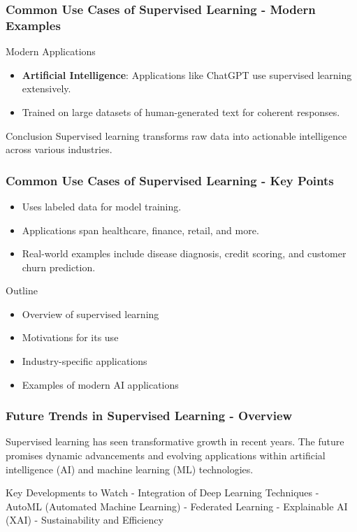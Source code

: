 \documentclass[aspectratio=169]{beamer}
\begin{document}
\begin{frame}[fragile]
    \frametitle{Common Use Cases of Supervised Learning - Modern Examples}
    \begin{block}{Modern Applications}
        \begin{itemize}
            \item \textbf{Artificial Intelligence}: Applications like ChatGPT use supervised learning extensively.
            \item Trained on large datasets of human-generated text for coherent responses.
        \end{itemize}
    \end{block}
    
    \begin{block}{Conclusion}
        Supervised learning transforms raw data into actionable intelligence across various industries.
    \end{block}
\end{frame}

\begin{frame}[fragile]
    \frametitle{Common Use Cases of Supervised Learning - Key Points}
    \begin{itemize}
        \item Uses labeled data for model training.
        \item Applications span healthcare, finance, retail, and more.
        \item Real-world examples include disease diagnosis, credit scoring, and customer churn prediction.
    \end{itemize}
    \begin{block}{Outline}
        \begin{itemize}
            \item Overview of supervised learning
            \item Motivations for its use
            \item Industry-specific applications
            \item Examples of modern AI applications
        \end{itemize}
    \end{block}
\end{frame}

\begin{frame}[fragile]
    \frametitle{Future Trends in Supervised Learning - Overview}
    Supervised learning has seen transformative growth in recent years. The future promises dynamic advancements and evolving applications within artificial intelligence (AI) and machine learning (ML) technologies.

    \begin{block}{Key Developments to Watch}
        - Integration of Deep Learning Techniques
        - AutoML (Automated Machine Learning)
        - Federated Learning
        - Explainable AI (XAI)
        - Sustainability and Efficiency
    \end{block}
\end{frame}
\end{document}
